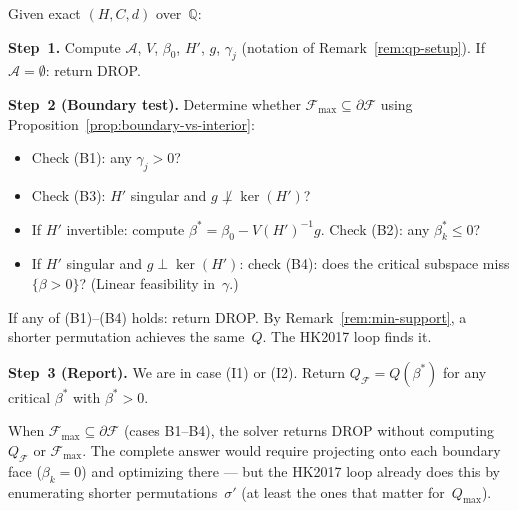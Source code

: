
\begin{algorithm}\label{alg:exact-solver}
Given exact $(H, C, d)$ over~$\mathbb{Q}$:

\medskip\noindent
\textbf{Step~1.}
Compute $\mathcal{A}$, $V$, $\beta_0$, $H'$, $g$, $\gamma_j$
(notation of Remark~\ref{rem:qp-setup}).
If $\mathcal{A} = \emptyset$: return DROP.

\medskip\noindent
\textbf{Step~2 (Boundary test).}
Determine whether $\mathcal{F}_{\max} \subseteq \partial\mathcal{F}$
using Proposition~\ref{prop:boundary-vs-interior}:
\begin{itemize}
  \item Check (B1): any $\gamma_j > 0$?
  \item Check (B3): $H'$ singular and $g \not\perp \ker(H')$?
  \item If $H'$ invertible:
    compute $\beta^* = \beta_0 - V(H')^{-1} g$.
    Check (B2): any $\beta^*_k \leq 0$?
  \item If $H'$ singular and $g \perp \ker(H')$:
    check (B4): does the critical subspace
    miss $\{\beta > 0\}$? (Linear feasibility in~$\gamma$.)
\end{itemize}

If any of (B1)--(B4) holds: return DROP.
By Remark~\ref{rem:min-support}, a shorter
permutation achieves the same~$Q$.
The HK2017 loop finds it.

\medskip\noindent
\textbf{Step~3 (Report).}
We are in case (I1) or (I2).
Return $Q_{\mathcal{F}} = Q(\beta^*)$
for any critical $\beta^*$ with $\beta^* > 0$.
\end{algorithm}

\begin{remark}%
\label{rem:exact-not-compute}
When $\mathcal{F}_{\max} \subseteq \partial\mathcal{F}$ (cases B1--B4),
the solver returns DROP without computing $Q_{\mathcal{F}}$ or
$\mathcal{F}_{\max}$.
The complete answer would require projecting onto each boundary
face ($\beta_k = 0$) and optimizing there --- but the HK2017 loop
already does this by enumerating shorter permutations~$\sigma'$
(at least the ones that matter for~$Q_{\max}$).
\end{remark}



